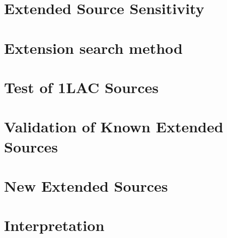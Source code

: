 \documentclass[12pt]{article}
\begin{document}
\section{Extended Source Sensitivity}


\section{Extension search method}



\section{Test of 1LAC Sources}

\section{Validation of Known Extended Sources}

\section{New Extended Sources}

\section{Interpretation}
\end{document}
